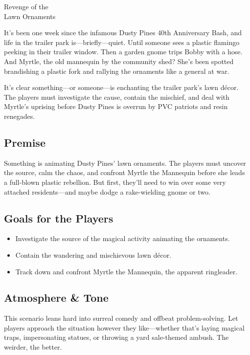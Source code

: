 \begin{WyrdScenarioHeading}{Revenge of the\\ Lawn Ornaments}
    \label{scenario:revenge-lawn-ornaments}

    It’s been one week since the infamous Dusty Pines 40th Anniversary Bash, and life in the trailer park is—briefly—quiet. Until someone sees a plastic flamingo peeking in their trailer window. Then a garden gnome trips Bobby with a hose. And Myrtle, the old mannequin by the community shed? She’s been spotted brandishing a plastic fork and rallying the ornaments like a general at war.

    It’s clear something—or someone—is enchanting the trailer park’s lawn décor. The players must investigate the cause, contain the mischief, and deal with Myrtle’s uprising before Dusty Pines is overrun by PVC patriots and resin renegades.

    \subsection*{Premise}
    Something is animating Dusty Pines’ lawn ornaments. The players must uncover the source, calm the chaos, and confront Myrtle the Mannequin before she leads a full-blown plastic rebellion. But first, they’ll need to win over some very attached residents—and maybe dodge a rake-wielding gnome or two.

    \subsection*{Goals for the Players}
    \begin{itemize}
        \item Investigate the source of the magical activity animating the ornaments.
        \item Contain the wandering and mischievous lawn décor.
        \item Track down and confront Myrtle the Mannequin, the apparent ringleader.
    \end{itemize}

    \subsection*{Atmosphere \& Tone}
    This scenario leans hard into surreal comedy and offbeat problem-solving. Let players approach the situation however they like—whether that’s laying magical traps, impersonating statues, or throwing a yard sale-themed ambush. The weirder, the better.

\end{WyrdScenarioHeading}

